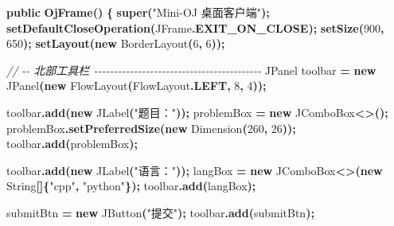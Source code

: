 \documentclass[
  11pt,
]{ctexart}
\newenvironment{Shaded}{\begin{snugshade}}{\end{snugshade}}
\newcommand{\BuiltInTok}[1]{#1}
\newcommand{\CommentTok}[1]{\textcolor[rgb]{0.56,0.35,0.01}{\textit{#1}}}
\newcommand{\DecValTok}[1]{\textcolor[rgb]{0.00,0.00,0.81}{#1}}
\newcommand{\FunctionTok}[1]{\textcolor[rgb]{0.13,0.29,0.53}{\textbf{#1}}}
\newcommand{\KeywordTok}[1]{\textcolor[rgb]{0.13,0.29,0.53}{\textbf{#1}}}
\newcommand{\NormalTok}[1]{#1}
\newcommand{\OperatorTok}[1]{\textcolor[rgb]{0.81,0.36,0.00}{\textbf{#1}}}
\newcommand{\StringTok}[1]{\textcolor[rgb]{0.31,0.60,0.02}{#1}}
\begin{document}
\begin{Shaded}
\begin{Highlighting}[]
    \KeywordTok{public} \FunctionTok{OjFrame}\OperatorTok{()} \OperatorTok{\{}
        \KeywordTok{super}\OperatorTok{(}\StringTok{"Mini{-}OJ 桌面客户端"}\OperatorTok{);}
        \FunctionTok{setDefaultCloseOperation}\OperatorTok{(}\BuiltInTok{JFrame}\OperatorTok{.}\FunctionTok{EXIT\_ON\_CLOSE}\OperatorTok{);}
        \FunctionTok{setSize}\OperatorTok{(}\DecValTok{900}\OperatorTok{,} \DecValTok{650}\OperatorTok{);}
        \FunctionTok{setLayout}\OperatorTok{(}\KeywordTok{new} \BuiltInTok{BorderLayout}\OperatorTok{(}\DecValTok{6}\OperatorTok{,} \DecValTok{6}\OperatorTok{));}

        \CommentTok{// {-}{-} 北部工具栏 {-}{-}{-}{-}{-}{-}{-}{-}{-}{-}{-}{-}{-}{-}{-}{-}{-}{-}{-}{-}{-}{-}{-}{-}{-}{-}{-}{-}{-}{-}{-}{-}{-}{-}{-}{-}{-}{-}{-}{-}{-}{-}}
        \BuiltInTok{JPanel}\NormalTok{ toolbar }\OperatorTok{=} \KeywordTok{new} \BuiltInTok{JPanel}\OperatorTok{(}\KeywordTok{new} \BuiltInTok{FlowLayout}\OperatorTok{(}\BuiltInTok{FlowLayout}\OperatorTok{.}\FunctionTok{LEFT}\OperatorTok{,} \DecValTok{8}\OperatorTok{,} \DecValTok{4}\OperatorTok{));}

\NormalTok{        toolbar}\OperatorTok{.}\FunctionTok{add}\OperatorTok{(}\KeywordTok{new} \BuiltInTok{JLabel}\OperatorTok{(}\StringTok{"题目："}\OperatorTok{));}
\NormalTok{        problemBox }\OperatorTok{=} \KeywordTok{new} \BuiltInTok{JComboBox}\OperatorTok{\textless{}\textgreater{}();}
\NormalTok{        problemBox}\OperatorTok{.}\FunctionTok{setPreferredSize}\OperatorTok{(}\KeywordTok{new} \BuiltInTok{Dimension}\OperatorTok{(}\DecValTok{260}\OperatorTok{,} \DecValTok{26}\OperatorTok{));}
\NormalTok{        toolbar}\OperatorTok{.}\FunctionTok{add}\OperatorTok{(}\NormalTok{problemBox}\OperatorTok{);}

\NormalTok{        toolbar}\OperatorTok{.}\FunctionTok{add}\OperatorTok{(}\KeywordTok{new} \BuiltInTok{JLabel}\OperatorTok{(}\StringTok{"语言："}\OperatorTok{));}
\NormalTok{        langBox }\OperatorTok{=} \KeywordTok{new} \BuiltInTok{JComboBox}\OperatorTok{\textless{}\textgreater{}(}\KeywordTok{new} \BuiltInTok{String}\OperatorTok{[]\{}\StringTok{"cpp"}\OperatorTok{,} \StringTok{"python"}\OperatorTok{\});}
\NormalTok{        toolbar}\OperatorTok{.}\FunctionTok{add}\OperatorTok{(}\NormalTok{langBox}\OperatorTok{);}

\NormalTok{        submitBtn }\OperatorTok{=} \KeywordTok{new} \BuiltInTok{JButton}\OperatorTok{(}\StringTok{"提交"}\OperatorTok{);}
\NormalTok{        toolbar}\OperatorTok{.}\FunctionTok{add}\OperatorTok{(}\NormalTok{submitBtn}\OperatorTok{);}


\end{Highlighting}
\end{Shaded}
\end{document}
